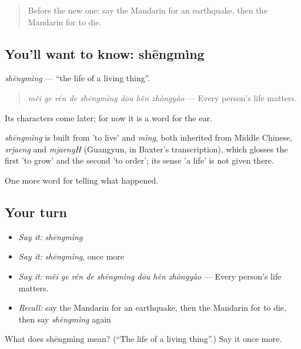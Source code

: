 \label{lesson:ZH-C300-shengming}



\begin{quote}
Before the new one: say the Mandarin for an earthquake, then the Mandarin for to die.
\end{quote}

\subsection*{You'll want to know: shēngmìng}
\emph{shēngmìng} — \textquotedblleft{}the life of a living thing\textquotedblright{}.

\begin{quote}
\emph{měi ge rén de shēngmìng dōu hěn zhòngyào} — Every person's life matters.
\end{quote}

Its characters come later; for now it is a word for the ear.

\begin{cousinweb}
\emph{shēngmìng} is built from  'to live' and \emph{mìng}, both inherited from Middle Chinese, \emph{srjaeng} and \emph{mjaengH} (Guangyun, in Baxter's transcription), which glosses the first 'to grow' and the second 'to order'; its sense 'a life' is not given there.
\end{cousinweb}

\begin{grammarlens}[title={What you've built}]
One more word for telling what happened.
\end{grammarlens}

\subsection*{Your turn}
\begin{itemize}
\raggedright
  \item \emph{Say it:} \emph{shēngmìng}
  \item \emph{Say it:} \emph{shēngmìng}, once more
  \item \emph{Say it:} \emph{měi ge rén de shēngmìng dōu hěn zhòngyào} — Every person's life matters.
  \item \emph{Recall:} say the Mandarin for an earthquake, then the Mandarin for to die, then say \emph{shēngmìng} again
\end{itemize}

\begin{tcolorbox}[breakable,colback=teal!4,colframe=teal!35!black,title={Before you move on}]
What does shēngmìng mean? (\textquotedblleft{}The life of a living thing\textquotedblright{}.) Say it once more.
\end{tcolorbox}
